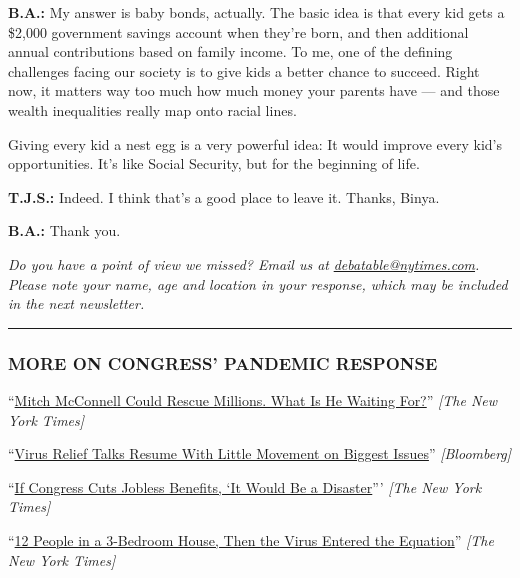 \textbf{B.A.:} My answer is baby bonds, actually. The basic idea is that
every kid gets a \$2,000 government savings account when they're born,
and then additional annual contributions based on family income. To me,
one of the defining challenges facing our society is to give kids a
better chance to succeed. Right now, it matters way too much how much
money your parents have --- and those wealth inequalities really map
onto racial lines.

Giving every kid a nest egg is a very powerful idea: It would improve
every kid's opportunities. It's like Social Security, but for the
beginning of life.

\textbf{T.J.S.:} Indeed. I think that's a good place to leave it.
Thanks, Binya.

\textbf{B.A.:} Thank you.

\emph{Do you have a point of view we missed? Email us at}
\href{mailto:debatable@nytimes.com}{\emph{debatable@nytimes.com}}\emph{.
Please note your name, age and location in your response, which may be
included in the next newsletter.}

\begin{center}\rule{0.5\linewidth}{\linethickness}\end{center}

\hypertarget{more-on-congress-pandemic-response}{%
\subsubsection{MORE ON CONGRESS' PANDEMIC
RESPONSE}\label{more-on-congress-pandemic-response}}

``\href{https://www.nytimes.com/2020/07/30/opinion/mitch-mcconnell-coronavirus-economy.html}{Mitch
McConnell Could Rescue Millions. What Is He Waiting For?}'' \emph{{[}The
New York Times{]}}

``\href{https://www.bloomberg.com/news/articles/2020-08-04/pelosi-mnuchin-signal-first-halting-progress-on-stimulus-deal}{Virus
Relief Talks Resume With Little Movement on Biggest Issues}''
\emph{{[}Bloomberg{]}}

``\href{https://www.nytimes.com/2020/07/22/opinion/sunday/unemployment-supplement-congress.html}{If
Congress Cuts Jobless Benefits, `It Would Be a Disaster}''' \emph{{[}The
New York Times{]}}

``\href{https://www.nytimes.com/2020/08/01/business/economy/housing-overcrowding-coronavirus.html}{12
People in a 3-Bedroom House, Then the Virus Entered the Equation}''
\emph{{[}The New York Times{]}}

